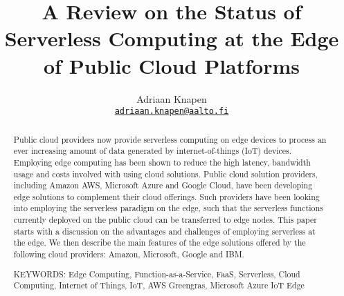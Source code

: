 \documentclass[article]{aaltoseries}
\begin{document}
 

\title{A Review on the Status of Serverless Computing at the Edge of Public Cloud Platforms}

\author{
Adriaan Knapen%
    \\\textnormal{
        \texttt{
            \href{mailto:adriaan.knapen@aalto.fi}{adriaan.knapen@aalto.fi}%
        }
    }
}
\maketitle

\begin{abstract}
Public cloud providers now provide serverless computing on edge devices to process an ever increasing amount of data generated by internet-of-things (IoT) devices. 
Employing edge computing has been shown to reduce the high latency, bandwidth usage and costs involved with using cloud solutions. 
Public cloud solution providers, including Amazon AWS, Microsoft Azure and Google Cloud, have been developing edge solutions to complement their cloud offerings.
Such providers have been looking into employing the serverless paradigm on the edge, such that the serverless functions currently deployed on the public cloud can be transferred to edge nodes.
This paper starts with a discussion on the advantages and challenges of employing serverless at the edge. 
We then describe the main features of the edge solutions offered by the following cloud providers: Amazon, Microsoft, Google and IBM.

\vspace{3mm}
\noindent KEYWORDS: Edge Computing, Function-as-a-Service, FaaS, Serverless, Cloud Computing, Internet of Things, IoT, AWS Greengras, Microsoft Azure IoT Edge

\end{abstract}
\end{document}

